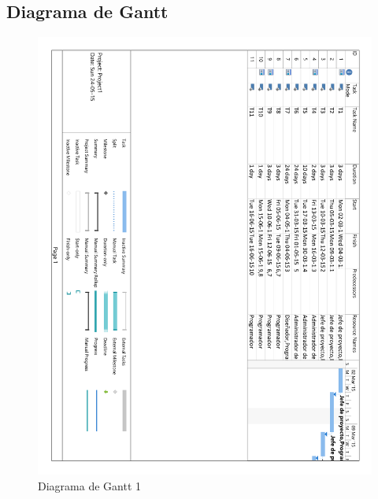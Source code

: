 \subsection{Diagrama de Gantt}

\begin{figure}[!htp]
	\centering
	\includegraphics[page=1, scale=.7]{fig/gantt_diagram}
	\caption{Diagrama de Gantt 1}
\end{figure}


